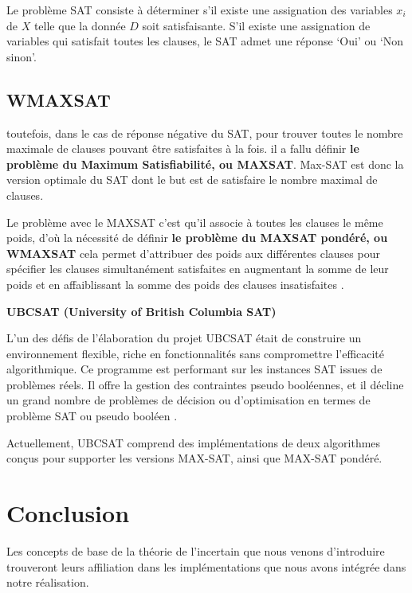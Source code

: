 Le problème SAT consiste à déterminer s’il existe une assignation des variables $x_i$ de $X$ telle que la donnée $D$ soit satisfaisante. S’il existe une assignation de variables qui satisfait toutes les clauses, le SAT admet une réponse ‘Oui’ ou ‘Non sinon’\cite{hkhallafiThesis}.
\subsection{WMAXSAT}

toutefois, dans le cas de réponse négative du SAT, pour trouver toutes le nombre maximale de clauses pouvant être satisfaites à la fois. il a fallu définir \textbf{le problème du Maximum Satisfiabilité, ou MAXSAT}. Max-SAT est donc la version optimale du SAT dont le but est de satisfaire le nombre maximal de clauses.

Le problème avec le MAXSAT c’est qu’il associe à toutes les clauses le même poids, d’où la nécessité de définir \textbf{le problème du MAXSAT pondéré, ou WMAXSAT} cela permet d'attribuer des poids aux différentes clauses pour spécifier les clauses simultanément satisfaites en augmentant la somme de leur poids et en affaiblissant la somme des poids des clauses insatisfaites \cite{hkhallafiThesis}.


\textbf{UBCSAT (University of British Columbia SAT)}

L'un des défis de l'élaboration du projet UBCSAT était de construire un environnement flexible, riche en fonctionnalités sans compromettre l'efficacité algorithmique. Ce programme est performant sur les instances SAT issues de problèmes réels. Il offre la gestion des contraintes pseudo booléennes, et il décline un grand nombre de problèmes de décision ou d’optimisation en termes de problème SAT ou pseudo booléen    \cite{hassenThesis}.

Actuellement, UBCSAT comprend des implémentations de deux algorithmes conçus pour supporter les versions MAX-SAT, ainsi que MAX-SAT pondéré.

{}
\section*{Conclusion}
Les concepts de base de la théorie de l’incertain que nous venons d'introduire trouveront leurs affiliation dans les implémentations que nous avons intégrée dans notre réalisation. 